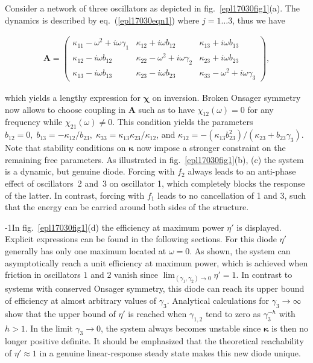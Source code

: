 \documentclass[doublecol,final,edchoice]{epl2}
\begin{document}
Consider a network of three oscillators as depicted in fig.~\ref{epl17030fig1}(a). The dynamics is described by eq.~(\ref{epl17030eqn1}) where $j=1\ldots3$, thus we have
\begin{small}
\begin{eqnarray*}
\mathbf{A}=\begin{pmatrix}
\kappa_{11}-\omega^2+i\omega\gamma_1 &\kappa_{12}+i\omega b_{12} &\kappa_{13}+i\omega b_{13} \\[1pt]
\kappa_{12}-i\omega b_{12} & \kappa_{22}-\omega^2+i\omega\gamma_2& \kappa_{23}+i\omega b_{23}\\[1pt]
\kappa_{13}-i\omega b_{13} & \kappa_{23}-i\omega b_{23} & \kappa_{33}-\omega^2+i\omega\gamma_3
\end{pmatrix},
\end{eqnarray*}
\end{small}%
which yields a lengthy expression for $\bm{\chi}$ on inversion. Broken Onsager symmetry now allows to choose coupling  in $\mathbf{A}$ such as to have $\chi_{12}(\omega)=0$ for any frequency while $\chi_{21}(\omega)\neq0$. This condition yields the parameters $b_{12} = 0,\; b_{13} = -\kappa_{12}/b_{23},\; \kappa_{33} = \kappa_{13} \kappa_{23}/\kappa_{12}$, and $\kappa_{12} = -(\kappa_{13} b_{23}^2)/(\kappa_{23} + b_{23} \gamma_3)$. Note that stability conditions on $\bm{\kappa}$ now impose a stronger constraint on the remaining free parameters. As illustrated in fig.~\ref{epl17030fig1}(b), (c) the system is a dynamic, but genuine diode. Forcing with $f_2$ always leads to an anti-phase effect of oscillators~2 and~3 on oscillator 1, which completely blocks the response of the latter. In contrast, forcing with $f_1$ leads to no cancellation of 1 and 3, such that the energy can be carried around both sides of the structure.

\looseness-1In fig.~\ref{epl17030fig1}(d) the efficiency at maximum power $\eta'$ is displayed. Explicit expressions can be found in the following sections. For this diode $\eta'$ generally has only one maximum located at $\omega=0$. As shown, the system can asymptotically reach a unit efficiency at maximum power, which is achieved when friction in oscillators $1$ and $2$ vanish since $\lim_{(\gamma_1,\gamma_2) \rightarrow 0}\eta' = 1$. In contrast to systems with conserved Onsager symmetry, this diode can reach its upper bound of efficiency at almost arbitrary values of $\gamma_3$. Analytical calculations for $\gamma_3 \rightarrow \infty$ show that the upper bound of $\eta'$ is reached when $\gamma_{1,2}$ tend to zero as $\gamma_3^{-h}$ with $h>1$. In the limit $\gamma_3 \rightarrow 0$, the system always becomes unstable since $\bm{\kappa}$ is then no longer positive definite. It should be emphasized that the theoretical reachability of $\eta'\approx 1$ in a genuine linear-response steady state makes this new diode unique.
\end{document}
